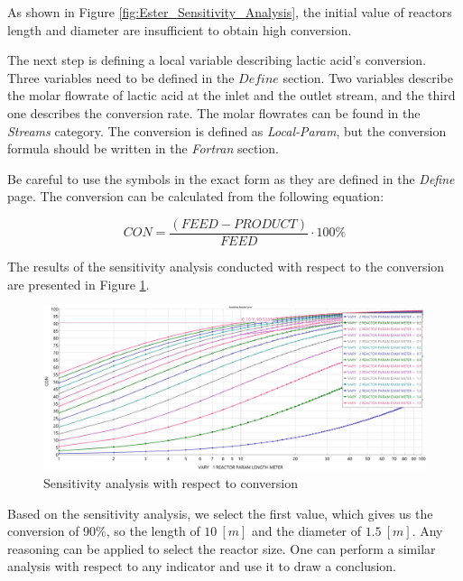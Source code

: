 As shown in Figure \ref{fig:Ester_Sensitivity_Analysis}, the initial value of reactors length and diameter are insufficient to obtain high conversion.

The next step is defining a local variable describing lactic acid's conversion. Three variables need to be defined in the $Define$ section. Two variables describe the molar flowrate of lactic acid at the inlet and the outlet stream, and the third one describes the conversion rate. The molar flowrates can be found in the \textit{Streams} category. The conversion is defined as \textit{Local-Param}, but the conversion formula should be written in the \textit{Fortran} section. 

Be careful to use the symbols in the exact form as they are defined in the \textit{Define} page. The conversion can be calculated from the following equation:

\begin{equation}
	CON = \frac{\left( FEED - PRODUCT \right)}{FEED} \cdot 100 \%
\end{equation}

The results of the sensitivity analysis conducted with respect to the conversion are presented in Figure \ref{fig:Ester_Sensitivity_Analysis_Conversion}.

\begin{figure}[h!]
	\centering
	\includegraphics[width=\textwidth]{Figures/Proces_Analysis/Parametric_sensitivity_analysis_conversion.jpg}
	\caption{Sensitivity analysis with respect to conversion}
	\label{fig:Ester_Sensitivity_Analysis_Conversion}
\end{figure}

Based on the sensitivity analysis, we select the first value, which gives us the conversion of 90\%, so the length of $10~[m]$ and the diameter of $1.5~[m]$. Any reasoning can be applied to select the reactor size. One can perform a similar analysis with respect to any indicator and use it to draw a conclusion.

